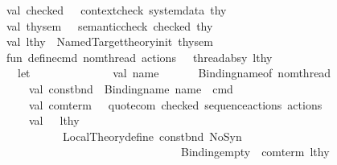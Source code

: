 \begin{isabellebody}
\ \ \ \ \ \ \ \ \ \ val\ checked\ \ {\isacharequal}{\kern0pt}\ context{\isacharunderscore}{\kern0pt}check\ system{\isacharunderscore}{\kern0pt}data\ thy\isanewline
\ \ \ \ \ \ \ \ \ \ val\ thy{\isacharunderscore}{\kern0pt}sem\ \ {\isacharequal}{\kern0pt}\ semantic{\isacharunderscore}{\kern0pt}check\ checked\ thy\isanewline
\isanewline
\ \ \ \ \ \ \ \ \ \ val\ lthy{}\ {\isacharequal}{\kern0pt}\ Named{\isacharunderscore}{\kern0pt}Target{\isachardot}{\kern0pt}theory{\isacharunderscore}{\kern0pt}init\ thy{\isacharunderscore}{\kern0pt}sem\isanewline
\isanewline
\ \ \ \ \ \ \ \ \ \ fun\ define{\isacharunderscore}{\kern0pt}cmd\ {\isacharparenleft}{\kern0pt}{\isacharbraceleft}{\kern0pt}nom{\isacharunderscore}{\kern0pt}thread{\isacharcomma}{\kern0pt}\ actions{\isacharcomma}{\kern0pt}\ {\isachardot}{\kern0pt}{\isachardot}{\kern0pt}{\isachardot}{\kern0pt}{\isacharbraceright}{\kern0pt}\ {\isacharcolon}{\kern0pt}\ thread{\isacharunderscore}{\kern0pt}absy{\isacharparenright}{\kern0pt}\ lthy\ {\isacharequal}{\kern0pt}\isanewline
\ \ \ \ \ \ \ \ \ \ \ \ let\isanewline
\ \ \ \ \ \ \ \ \ \ \ \ \ \ val\ name\ \ \ \ \ \ {\isacharequal}{\kern0pt}\ Binding{\isachardot}{\kern0pt}name{\isacharunderscore}{\kern0pt}of\ nom{\isacharunderscore}{\kern0pt}thread\isanewline
\ \ \ \ \ \ \ \ \ \ \ \ \ \ val\ const{\isacharunderscore}{\kern0pt}bnd\ {\isacharequal}{\kern0pt}\ Binding{\isachardot}{\kern0pt}name\ {\isacharparenleft}{\kern0pt}name\ {\isacharcircum}{\kern0pt}\ {\isachardoublequote}{\kern0pt}{\isacharunderscore}{\kern0pt}cmd{\isachardoublequote}{\kern0pt}{\isacharparenright}{\kern0pt}\isanewline
\ \ \ \ \ \ \ \ \ \ \ \ \ \ val\ com{\isacharunderscore}{\kern0pt}term\ \ {\isacharequal}{\kern0pt}\ quote{\isacharunderscore}{\kern0pt}com\ checked\ {\isacharparenleft}{\kern0pt}sequence{\isacharunderscore}{\kern0pt}actions\ actions{\isacharparenright}{\kern0pt}\isanewline
\ \ \ \ \ \ \ \ \ \ \ \ \ \ val\ {\isacharparenleft}{\kern0pt}{\isacharparenleft}{\kern0pt}{\isacharunderscore}{\kern0pt}{\isacharcomma}{\kern0pt}\ {\isacharunderscore}{\kern0pt}{\isacharparenright}{\kern0pt}{\isacharcomma}{\kern0pt}\ lthy{\isacharprime}{\kern0pt}{\isacharparenright}{\kern0pt}\ {\isacharequal}{\kern0pt}\isanewline
\ \ \ \ \ \ \ \ \ \ \ \ \ \ \ \ \ \ \ \ Local{\isacharunderscore}{\kern0pt}Theory{\isachardot}{\kern0pt}define\ {\isacharparenleft}{\kern0pt}{\isacharparenleft}{\kern0pt}const{\isacharunderscore}{\kern0pt}bnd{\isacharcomma}{\kern0pt}\ NoSyn{\isacharparenright}{\kern0pt}{\isacharcomma}{\kern0pt}\isanewline
\ \ \ \ \ \ \ \ \ \ \ \ \ \ \ \ \ \ \ \ \ \ \ \ \ \ \ \ \ \ \ \ \ \ \ \ \ \ \ \ \ {\isacharparenleft}{\kern0pt}{\isacharparenleft}{\kern0pt}Binding{\isachardot}{\kern0pt}empty{\isacharcomma}{\kern0pt}\ {\isacharbrackleft}{\kern0pt}{\isacharbrackright}{\kern0pt}{\isacharparenright}{\kern0pt}{\isacharcomma}{\kern0pt}\ com{\isacharunderscore}{\kern0pt}term{\isacharparenright}{\kern0pt}{\isacharparenright}{\kern0pt}\ lthy\isanewline

\end{isabellebody}
